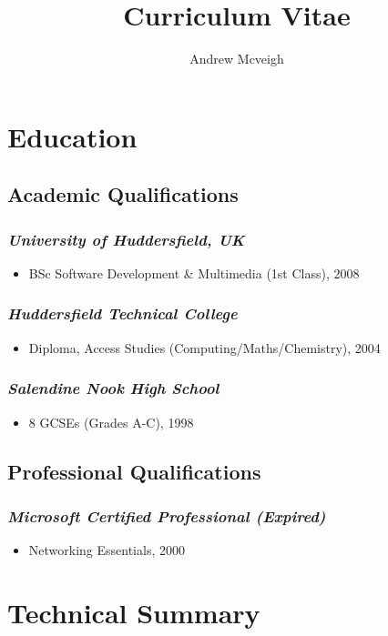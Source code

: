 \documentclass{article}
\title{Curriculum Vitae}
\author{Andrew Mcveigh}
\date{}
\begin{document}
\maketitle
\section*{Education}
\subsection*{Academic Qualifications}
\subsubsection*{\emph{University of Huddersfield, UK}}
\begin{itemize}
\item BSc Software Development \& Multimedia (1st Class), 2008
\end{itemize}
\subsubsection*{\emph{Huddersfield Technical College}}
\begin{itemize}
\item Diploma, Access Studies (Computing/Maths/Chemistry), 2004
\end{itemize}
\subsubsection*{\emph{Salendine Nook High School}}
\begin{itemize}
\item 8 GCSEs (Grades A-C), 1998
\end{itemize}
\subsection*{Professional Qualifications}
\subsubsection*{\emph{Microsoft Certified Professional (Expired)}}
\begin{itemize}
\item Networking Essentials, 2000
\end{itemize}
\section*{Technical Summary}
\end{document}
